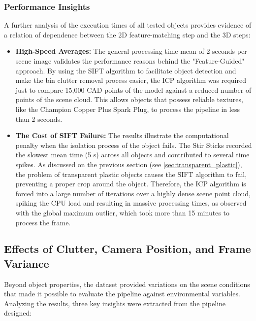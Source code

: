 \subsubsection*{Performance Insights}
A further analysis of the execution times  of all tested objects provides evidence of a  relation of dependence between the 2D feature-matching step and the 3D steps:

\begin{itemize}
    \item \textbf{High-Speed Averages:} The general processing time mean of 2 seconds per scene image validates the performance reasons behind the "Feature-Guided" approach. By using the SIFT algorithm to facilitate object detection and make the bin clutter removal process easier, the ICP algorithm was required just to compare 15,000 CAD points of the model against a reduced number of points of the scene cloud. This allows objects that possess reliable textures, like the Champion Copper Plus Spark Plug, to process the pipeline in less than 2 seconds. 
    
    \item \textbf{The Cost of SIFT Failure:} The results illustrate the computational penalty when the isolation process of the object fails. The Stir Sticks recorded the slowest mean time (5 s) across all objects and contributed to several time spikes. As discussed on the previous section (see \ref{sec:transparent_plastic}), the problem of transparent plastic objects causes the SIFT algorithm to fail, preventing a proper crop around the object. Therefore, the ICP algorithm is forced into a large number of iterations over a highly dense scene point cloud, spiking the CPU load and resulting in massive processing times, as observed with the global maximum outlier, which took more than 15 minutes to process the frame.
\end{itemize}

\subsection{Effects of Clutter, Camera Position, and Frame Variance}
Beyond object properties, the dataset provided variations on the scene conditions that made it possible to evaluate the pipeline against environmental variables. Analyzing the results, three key insights were extracted from the pipeline designed:

